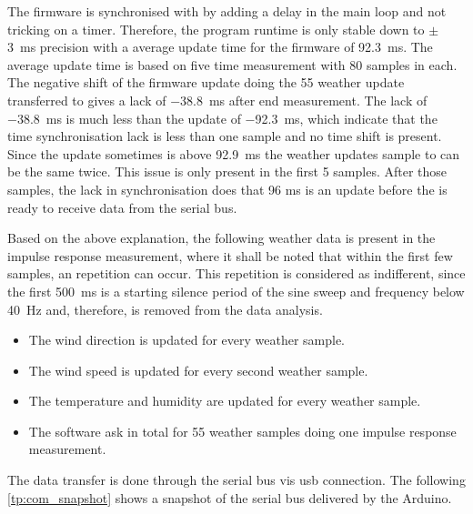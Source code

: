 The firmware is synchronised with \matlab by adding a delay in the main loop and not tricking on a timer. Therefore, the program runtime is only stable down to $\pm$ \SI{3}{\milli\second} precision with a average update time for the firmware of \SI{92.3}{\milli\second}. The average update time is based on five time measurement with 80 samples in each. The negative shift of the firmware update doing the 55 weather update transferred to \matlab gives a lack of \SI{-38.8}{\milli\second} after end measurement.  The lack of \SI{-38.8}{\milli\second} is much less than the update of \SI{-92.3}{\milli\second}, which indicate that the time synchronisation lack is less than one sample and no time shift is present. Since the update sometimes is above \SI{92.9}{\milli\second} the weather updates sample to \matlab can be the same twice. This issue is only present in the first 5 samples. After those samples, the lack in synchronisation does that 96 ms is an update before the \matlab is ready to receive data from the serial bus.

Based on the above explanation, the following weather data is present in the impulse response measurement, where it shall be noted that within the first few samples, an repetition can occur. This repetition is considered as indifferent, since the first \SI{500}{\milli\second} is a starting silence period of the sine sweep and frequency below \SI{40}{\hertz} and, therefore, is removed from the data analysis. 

\begin{itemize}
\item The wind direction is updated for every weather sample.  
\item The wind speed is updated for every second weather sample.
\item The temperature and humidity are updated for every weather sample.
\item The \matlab software ask in total for 55 weather samples doing one impulse response measurement. 
\end{itemize}

The data transfer is done through the serial bus vis \gls{usb} connection. The following \autoref{tp:com_snapshot} shows a snapshot of the serial bus delivered by the Arduino.


